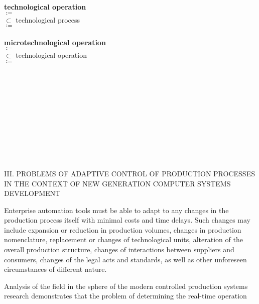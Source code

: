 \documentclass{article}
\begin{document}
\begin{multicols}{2}
\textbf{technological operation}\\
\(\coloneqq\) \quad[TCO]\\
\(\subset\) \quad technological process\\
\(\coloneqq\) \\ \\
\textbf{microtechnological operation}\\
\(\coloneqq\) \quad[MTCO]\\
\(\subset\) \quad technological operation\\
\(\coloneqq\) \\ 
\\ \\ \\ \\ \\ \\ \\ \\ \\ \\
\begin{center}
    \small III. PROBLEMS OF ADAPTIVE CONTROL OF PRODUCTION PROCESSES IN THE CONTEXT OF NEW GENERATION COMPUTER SYSTEMS DEVELOPMENT
\end{center} 
\par
Enterprise automation tools must be able to adapt
to any changes in the production process itself with
minimal costs and time delays. Such changes may include
expansion or reduction in production volumes, changes
in production nomenclature, replacement or changes of
technological units, alteration of the overall production
structure, changes of interactions between suppliers and
consumers, changes of the legal acts and standards, as
well as other unforeseen circumstances of different nature. \par
Analysis of the field in the sphere of the modern
controlled production systems research demonstrates
that the problem of determining the real-time operation

\end{multicols}
\end{document}
